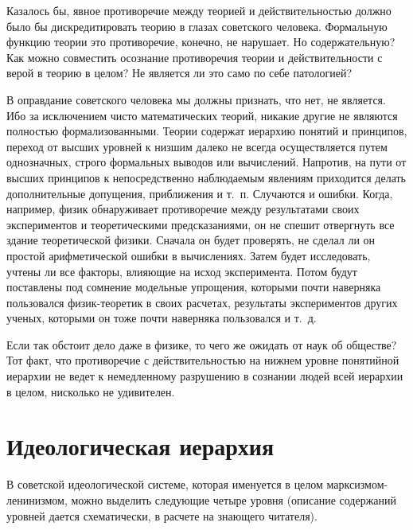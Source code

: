 \documentclass{book}
\begin{document}
Казалось бы, явное противоречие между теорией и действительностью должно было бы дискредитировать теорию в глазах советского 
человека. Формальную функцию теории это противоречие, конечно, не нарушает. Но содержательную? Как можно совместить осознание 
противоречия теории и действительности с верой в теорию в целом? Не является ли это само по себе патологией?

В оправдание советского человека мы должны признать, что нет, не является. Ибо за исключением чисто математических теорий, 
никакие другие не являются полностью формализованными.  Теории содержат иерархию понятий и принципов, переход от высших уровней 
к низшим далеко не всегда осу­ществляется путем однозначных, строго формальных выводов или вычислений. Напротив, на пути от 
высших принципов к непосредственно наблюдаемым явлениям приходится делать дополнительные допущения, приближения и т.~п. 
Случаются и ошибки. Когда, например, физик обнаруживает противоречие между результатами своих экспериментов и теоретическими 
предсказаниями, он не спешит отвергнуть все здание теоре­тической физики. Сначала он будет проверять, не сделал ли он простой 
арифметической ошибки в вычислениях. Затем будет исследовать, учтены ли все факторы, влияющие на исход эксперимента. Потом будут 
поставлены под сомнение модель­ные упрощения, которыми почти наверняка пользовался фи­зик-теоретик в своих расчетах, результаты 
экспериментов других ученых, которыми он тоже почти наверняка пользо­вался и т.~д.

Если так обстоит дело даже в физике, то чего же ожидать от наук об обществе? Тот факт, что противоречие с действи­тельностью на 
нижнем уровне понятийной иерархии не ведет к немедленному разрушению в сознании людей всей иерархии в целом, нисколько не 
удивителен.

\section{Идеологическая иерархия}

В советской идеологической системе, которая именуется в целом марксизмом-ленинизмом, можно выделить следующие четыре уровня 
(описание содержаний уровней дается схематически, в расчете на знающего читателя).
\end{document}
